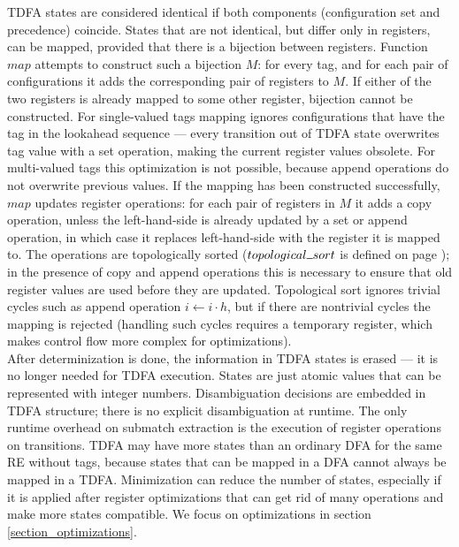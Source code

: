 \documentclass[]{article}
\newcommand{\Xund}{\rule{.5em}{.5pt}}
\begin{document}
TDFA states are considered identical if both components (configuration set and precedence) coincide.
States that are not identical, but differ only in registers, can be mapped, provided that there is a bijection between registers.
Function $map$ attempts to construct such a bijection $M$:
for every tag, and for each pair of configurations
it adds the corresponding pair of registers to $M$.
If either of the two registers is already mapped to some other register, bijection cannot be constructed.
For single-valued tags mapping ignores configurations that have the tag in the lookahead sequence ---
every transition out of TDFA state overwrites tag value with a set operation, making the current register values obsolete.
For multi-valued tags this optimization is not possible, because append operations do not overwrite previous values.
If the mapping has been constructed successfully, $map$ updates register operations:
for each pair of registers in $M$ it adds a copy operation,
unless the left-hand-side is already updated by a set or append operation,
in which case it replaces left-hand-side with the register it is mapped to.
The operations are topologically sorted ($topological \Xund sort$ is defined on page \pageref{alg_opt});
in the presence of copy and append operations this is necessary to ensure that old register values are used before they are updated.
Topological sort ignores trivial cycles such as append operation $i \leftarrow i \cdot h$,
but if there are nontrivial cycles the mapping is rejected
(handling such cycles requires a temporary register, which makes control flow more complex for optimizations).
\\

After determinization is done, the information in TDFA states is erased --- it is no longer needed for TDFA execution.
States are just atomic values that can be represented with integer numbers.
Disambiguation decisions are embedded in TDFA structure; there is no explicit disambiguation at runtime.
The only runtime overhead on submatch extraction is the execution of register operations on transitions.
TDFA may have more states than an ordinary DFA for the same RE without tags, because states that can be mapped in a DFA cannot always be mapped in a TDFA.
Minimization can reduce the number of states,
especially if it is applied after register optimizations that can get rid of many operations and make more states compatible.
We focus on optimizations in section \ref{section_optimizations}.
\\
\end{document}
